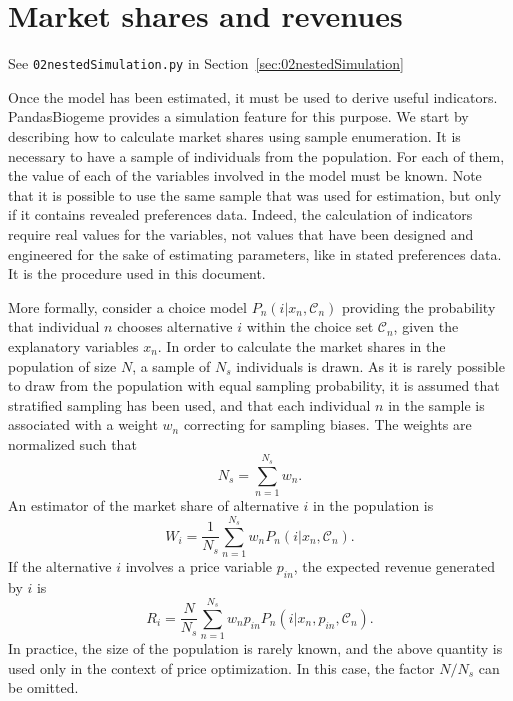 \documentclass[12pt,a4paper]{article}
\newcommand{\C}{\mathcal{C}}
\begin{document}
\section{Market shares and revenues}

\begin{flushright}
See \lstinline$02nestedSimulation.py$ in Section~\ref{sec:02nestedSimulation}
\end{flushright}


Once the model has been estimated, it must be used to derive useful
indicators. PandasBiogeme provides a simulation feature for this
purpose. We start by describing how to calculate market shares using
sample enumeration. It is necessary to have a sample of individuals
from the population. For each of them, the value of each of the
variables involved in the model must be known.  Note that it is possible to use the same sample
that was used for estimation, but only if it contains revealed
preferences data. Indeed, the calculation of indicators require real
values for the variables, not values that have been designed and engineered for the
sake of estimating parameters, like in stated preferences data. It is the procedure used in this document. 


More formally, consider a choice model $P_n(i|x_n, \C_n)$ providing
the probability that individual $n$ chooses alternative $i$ within the
choice set $\C_n$, given the explanatory variables $x_n$.  In order to
calculate the market shares in the population of size $N$, a sample of
$N_s$ individuals is drawn. As it is rarely possible to draw from the
population with equal sampling probability, it is assumed that
stratified sampling has been used, and that each individual $n$ in the
sample is associated with a weight $w_n$ correcting for sampling
biases. The weights are normalized such that
\begin{equation}
  \label{eq:normalizingWeights}
N_s = \sum_{n=1}^{N_s} w_n.
\end{equation}
An estimator of the market share of alternative $i$ in the population is
\begin{equation}
  \label{eq:marketShare}
W_i = \frac{1}{N_s} \sum_{n=1}^{N_s} w_n P_n(i|x_n, \C_n).
\end{equation}
If the alternative $i$ involves a price variable $p_{in}$, the expected revenue
generated by $i$ is
\begin{equation}
  \label{eq:revenues}
R_i = \frac{N}{N_s} \sum_{n=1}^{N_s} w_n p_{in} P_n(i|x_n, p_{in}, \C_n).
\end{equation}
In practice, the size of the population is rarely known, and the above
quantity is used only in the context of price optimization. In this
case, the factor $N/N_s$ can be omitted. 
\end{document}
